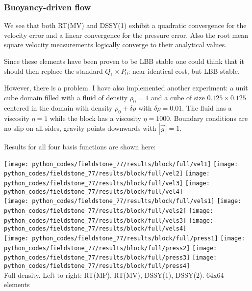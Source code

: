\subsubsection*{Buoyancy-driven flow}

We see that both RT(MV) and DSSY(1) exhibit a quadratic convergence for the
velocity error and a linear convergence for the pressure error. Also the root mean square 
velocity measurements logically converge to their analytical values.  

Since these elements have been proven to be LBB stable one could think that it 
should then replace the standard $Q_1 \times P_0$: near identical cost, but LBB stable.

However, there is  a problem. I have also implemented another experiment: a unit cube domain
filled with a fluid of density $\rho_0=1$ and a cube of size $0.125\times 0.125$ centered in the domain
with density $\rho_0+\delta \rho$ with $\delta\rho=0.01$. The fluid has a viscosity $\eta=1$ while the 
block has a viscosity $\eta=1000$.
Boundary conditions are no slip on all sides, gravity points downwards with $|\vec{g}|=1$.

Results for all four basis functions are shown here:
\begin{center}
\texttt{[image: python\_codes/fieldstone\_77/results/block/full/vel1]}
\texttt{[image: python\_codes/fieldstone\_77/results/block/full/vel2]}
\texttt{[image: python\_codes/fieldstone\_77/results/block/full/vel3]}
\texttt{[image: python\_codes/fieldstone\_77/results/block/full/vel4]}\\
\texttt{[image: python\_codes/fieldstone\_77/results/block/full/vels1]}
\texttt{[image: python\_codes/fieldstone\_77/results/block/full/vels2]}
\texttt{[image: python\_codes/fieldstone\_77/results/block/full/vels3]}
\texttt{[image: python\_codes/fieldstone\_77/results/block/full/vels4]}\\
\texttt{[image: python\_codes/fieldstone\_77/results/block/full/press1]}
\texttt{[image: python\_codes/fieldstone\_77/results/block/full/press2]}
\texttt{[image: python\_codes/fieldstone\_77/results/block/full/press3]}
\texttt{[image: python\_codes/fieldstone\_77/results/block/full/press4]}\\
{\captionfont Full density. Left to right: RT(MP), RT(MV), DSSY(1), DSSY(2). 64x64 elements}
\end{center}

